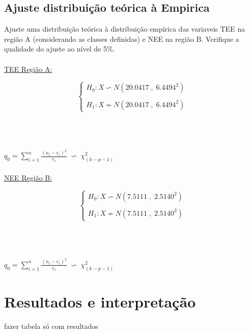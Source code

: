 \subsection{Ajuste distribuição teórica à Empirica}
Ajuste uma distribuição teórica à distribuição empírica das variaveis TEE na região A (considerando as classes definidas) e NEE na região B. Verifique a qualidade do ajuste ao nível de 5\%.\\
\\
\hspace*{5cm} \underline{TEE Região A:} \\
\begin{minipage}[l]{0pt}
$$\left\lbrace\begin{array}{l}
H_0: X \backsim N (20.0417\;,\;6.4494^2) \\
\\
H_1: X \nsim N (20.0417\;,\;6.4494^2)
\end{array}\right.$$
\end{minipage}\\
\\
\\
$q_0=\sum_{i=1}^n \frac{(n_i-e_i)^2}{e_i} \;\backsim\; \chi_{(k-p-1)}^2$ \\
\\
\hspace*{5cm} \underline{NEE Região B:} \\
\begin{minipage}[l]{0pt}
$$\left\lbrace\begin{array}{l}
H_0: X \backsim N (7.5111\;,\;2.5140^2) \\
\\
H_1: X \nsim N (7.5111\;,\;2.5140^2)
\end{array}\right.$$
\end{minipage}\\
\\
\\
$q_0=\sum_{i=1}^n \frac{(n_i-e_i)^2}{e_i} \;\backsim\; \chi_{(k-p-1)}^2$ \\









\newpage




\newpage
\section{Resultados e interpretação}\label{Resultados}
fazer tabela só com resultados\\
